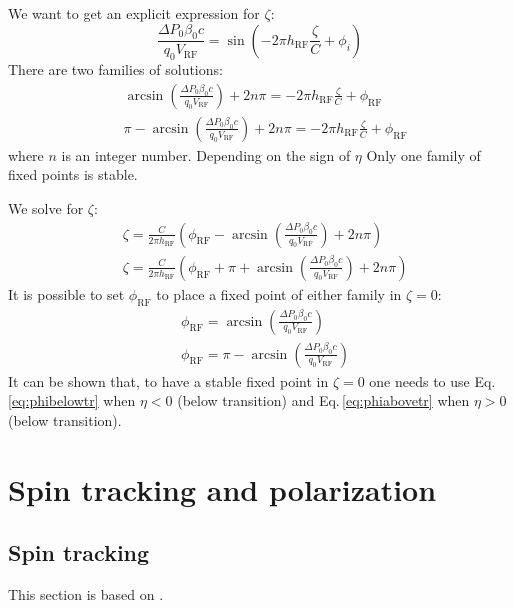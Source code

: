 We want to get an explicit expression for $\zeta$:
\begin{equation}
 \frac{\Delta P_0\beta_0 c }{q_0 V_\text{RF}} 
 = 
\sin\left(
-2 \pi h_\text{RF} \frac{\zeta}{C} + \phi_i \right)
\end{equation}
There are two families of solutions:
\begin{align}
 &\arcsin\left(\frac{\Delta P_0\beta_0 c }{q_0 V_\text{RF}} \right)
 + 2 n \pi
 = 
-2 \pi h_\text{RF} \frac{\zeta}{C} + \phi_\text{RF} \\
 &\pi - \arcsin\left(\frac{\Delta P_0\beta_0 c }{q_0 V_\text{RF}} \right)
 + 2 n \pi
 = 
-2 \pi h_\text{RF} \frac{\zeta}{C} + \phi_\text{RF}
\end{align}
where $n$ is an integer number. Depending on the sign of $\eta$ Only one family of fixed points is stable.

We solve for $\zeta$:
\begin{align}
&\zeta =
 \frac{C}{2 \pi h_\text{RF}} \left(
 \phi_\text{RF}
 -\arcsin\left(\frac{\Delta P_0\beta_0 c }{q_0 V_\text{RF}} \right)
 +2 n \pi
 \right)\\
 &\zeta =
 \frac{C}{2 \pi h_\text{RF}} \left(
 \phi_\text{RF} + \pi
 +\arcsin\left(\frac{\Delta P_0\beta_0 c }{q_0 V_\text{RF}} \right)
 +2 n \pi
 \right)
\end{align}
It is possible to set $\phi_\text{RF}$ to place a fixed point of either family in $\zeta = 0$:
\begin{align}
&\phi_\text{RF} = 
 \arcsin\left(\frac{\Delta P_0\beta_0 c }{q_0 V_\text{RF}} \right)
 \label{eq:phibelowtr}
 \\
 & \phi_\text{RF} = 
 \pi
 - \arcsin\left(\frac{\Delta P_0\beta_0 c }{q_0 V_\text{RF}} \right)
  \label{eq:phiabovetr}
\end{align}
It can be shown that, to have a stable fixed point in $\zeta=0$ one needs to use Eq.\,\ref{eq:phibelowtr} when $\eta<0$ (below transition) and Eq.\,\ref{eq:phiabovetr} when $\eta>0$ (below transition).

\chapter{Spin tracking and polarization}

\section{Spin tracking}

This section is based on \cite{hoffstaetter2006high, Sagan:BmadManual}.

